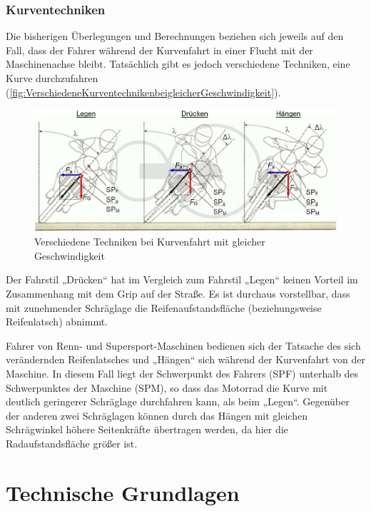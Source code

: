 \subsubsection{Kurventechniken}
Die bisherigen Überlegungen und Berechnungen beziehen sich jeweils auf den Fall, dass der Fahrer während der Kurvenfahrt in einer Flucht mit der Maschinenachse bleibt. Tatsächlich gibt es jedoch verschiedene Techniken, eine Kurve durchzufahren (\autoref{fig:VerschiedeneKurventechnikenbeigleicherGeschwindigkeit}).
\begin{figure}[htpb]
	\centering
	\includegraphics[width=\linewidth]{Bilder/VerschiedeneKurventechnikenbeigleicherGeschwindigkeit_pdf.pdf}
	\caption{Verschiedene Techniken bei Kurvenfahrt mit gleicher Geschwindigkeit \citep{Haedrich2012}}
	\label{fig:VerschiedeneKurventechnikenbeigleicherGeschwindigkeit}
\end{figure}

Der Fahrstil „Drücken“ hat im Vergleich zum Fahrstil „Legen“ keinen Vorteil im Zusammenhang mit dem Grip auf der Straße. Es ist durchaus vorstellbar, dass mit zunehmender Schräglage die Reifenaufstandsfläche (beziehungsweise Reifenlatsch) abnimmt.

Fahrer von Renn- und Supersport-Maschinen bedienen sich der Tatsache des sich verändernden Reifenlatsches und „Hängen“ sich während der Kurvenfahrt von der Maschine. In diesem Fall liegt der Schwerpunkt des Fahrers (SPF) unterhalb des Schwerpunktes der Maschine (SPM), so dass das Motorrad die Kurve mit deutlich geringerer Schräglage durchfahren kann, als beim „Legen“. Gegenüber der anderen zwei Schräglagen können durch das \glqq Hängen\grqq{} mit gleichen Schrägwinkel höhere Seitenkräfte übertragen werden, da hier die Radaufstandsfläche größer ist.


%
%
%
%
\section{Technische Grundlagen} \label{Technik}



